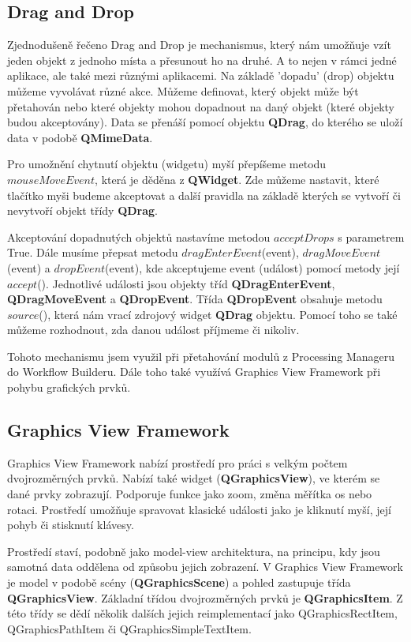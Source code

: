 \subsection{Drag and Drop}
Zjednodušeně řečeno Drag and Drop je mechanismus, který nám umožňuje vzít jeden objekt z jednoho místa a přesunout ho na druhé. A to nejen v rámci jedné aplikace, ale také mezi různými aplikacemi. Na základě 'dopadu' (drop) objektu můžeme vyvolávat různé akce. Můžeme definovat, který objekt může být přetahován nebo které objekty mohou dopadnout na daný objekt (které objekty budou akceptovány). Data se přenáší pomocí objektu \textbf{QDrag}, do kterého se uloží data v podobě \textbf{QMimeData}.

Pro umožnění chytnutí objektu (widgetu) myší přepíšeme metodu $mouseMoveEvent$, která je děděna z \textbf{QWidget}. Zde můžeme nastavit, které tlačítko myši budeme akceptovat a další pravidla na základě kterých se vytvoří či nevytvoří objekt třídy \textbf{QDrag}. 

Akceptování dopadnutých objektů nastavíme metodou $acceptDrops$ s parametrem True. Dále musíme přepsat metodu $dragEnterEvent$(event), $dragMoveEvent$(event) a $dropEvent$(event), kde akceptujeme event (událost) pomocí metody její $accept$(). Jednotlivé události jsou objekty tříd \textbf{QDragEnterEvent}, \textbf{QDragMoveEvent} a \textbf{QDropEvent}. Třída \textbf{QDropEvent} obsahuje metodu $source$(), která nám vrací zdrojový widget \textbf{QDrag} objektu. Pomocí toho se také můžeme rozhodnout, zda danou událost příjmeme či nikoliv.

Tohoto mechanismu jsem využil při přetahování modulů z Processing Manageru do Workflow Builderu. Dále toho také využívá Graphics View Framework při pohybu grafických prvků.

\subsection{Graphics View Framework}
Graphics View Framework nabízí prostředí pro práci s velkým počtem dvojrozměrných prvků. Nabízí také widget (\textbf{QGraphicsView}), ve kterém se dané prvky zobrazují. Podporuje funkce jako zoom, změna měřítka os nebo rotaci. Prostředí umožňuje spravovat klasické události jako je kliknutí myší, její pohyb či stisknutí klávesy. 

Prostředí staví, podobně jako model-view architektura, na principu, kdy jsou samotná data oddělena od způsobu jejich zobrazení. V Graphics View Framework je model v podobě scény (\textbf{QGraphicsScene}) a pohled zastupuje třída \textbf{QGraphicsView}. Základní třídou dvojrozměrných prvků je \textbf{QGraphicsItem}. Z této třídy se dědí několik dalších jejich reimplementací jako QGraphicsRectItem, QGraphicsPathItem či QGraphicsSimpleTextItem. 

